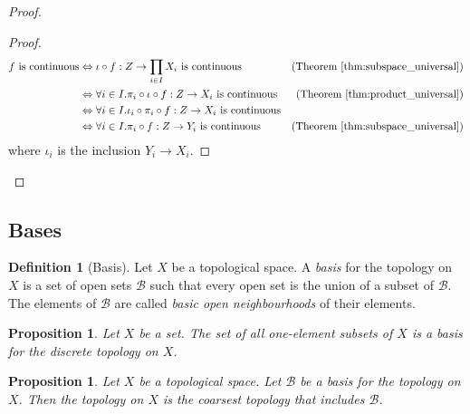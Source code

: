 \documentclass{book}
\let\qed\relax
\newtheorem{prop}[ax]{Proposition}
\theoremstyle{definition}
\newtheorem{df}[ax]{Definition}
\begin{document}
\begin{proof}
\pf
{}
\begin{proof}
	\pf
	\begin{align*}
		f \text{ is continuous}
		& \Leftrightarrow \iota \circ f : Z \rightarrow \prod_{i \in I} X_i \text{ is continuous} & (\text{Theorem \ref{thm:subspace_universal}}) \\
		& \Leftrightarrow \forall i \in I. \pi_i \circ \iota \circ f : Z \rightarrow X_i \text{ is continuous} & (\text{Theorem \ref{thm:product_universal}}) \\
		& \Leftrightarrow \forall i \in I. \iota_i \circ \pi_i \circ f : Z \rightarrow X_i \text{ is continuous} \\
		& \Leftrightarrow \forall i \in I. \pi_i \circ f : Z \rightarrow Y_i \text{ is continuous}
		& (\text{Theorem \ref{thm:subspace_universal}})
	\end{align*}
	where $\iota_i$ is the inclusion $Y_i \rightarrow X_i$.
\end{proof}
\qed
\end{proof}

\subsection{Bases}

\begin{df}[Basis]
Let $X$ be a topological space. A \emph{basis} for the topology on $X$ is a set of open sets $\mathcal{B}$ such that every open set is the union of a subset of $\mathcal{B}$. The elements of $\mathcal{B}$ are called \emph{basic open neighbourhoods} of their elements.
\end{df}

\begin{prop}
Let $X$ be a set. The set of all one-element subsets of $X$ is a basis for the discrete topology on $X$.
\end{prop}

\begin{prop}
Let $X$ be a topological space.
Let $\mathcal{B}$ be a basis for the topology on $X$.
Then the topology on $X$ is the coarsest topology that includes $\mathcal{B}$.
\end{prop}
\end{document}
